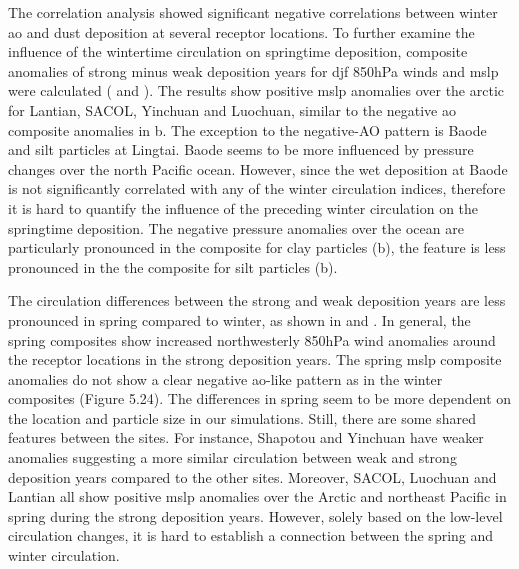 The correlation analysis showed significant negative correlations between winter \acrshort{ao} and dust deposition at several receptor locations. 
To further examine the influence of the wintertime circulation on springtime deposition,  composite anomalies of strong minus weak deposition years for \acrshort{djf} 850hPa winds and \acrshort{mslp} were calculated ( and ). The results show positive \acrshort{mslp} anomalies over the arctic for Lantian, SACOL, Yinchuan and Luochuan, similar to the negative \acrshort{ao} composite anomalies in b. 
The exception to the negative-AO pattern is Baode and silt particles at Lingtai. Baode seems to be more influenced by pressure changes over the north Pacific ocean. 
However, since the wet deposition at Baode is not significantly correlated with any of the winter circulation indices, therefore it is hard to quantify the influence of the preceding winter circulation on the springtime deposition. 
The negative pressure anomalies over the ocean are particularly pronounced in the composite for clay particles (b), the feature is less pronounced in the the composite for silt particles (b).       

The circulation differences between the strong and weak deposition years are less pronounced in spring compared to winter, as shown in  and . 
In general, the spring composites show increased northwesterly 850hPa wind anomalies around the receptor locations in the strong deposition years.
The spring \acrshort{mslp} composite anomalies do not show a clear negative \acrshort{ao}-like pattern as in the winter composites (Figure 5.24). The differences in spring seem to be more dependent on the location and particle size in our simulations. 
Still, there are some shared features between the sites. 
For instance, Shapotou and Yinchuan have weaker anomalies suggesting a more similar circulation between weak and strong deposition years compared to the other sites.
Moreover, SACOL, Luochuan and Lantian all show positive \acrshort{mslp} anomalies over the Arctic and northeast Pacific in spring during the strong deposition years.
However, solely based on the low-level circulation changes, it is hard to establish a connection between the spring and winter circulation.

